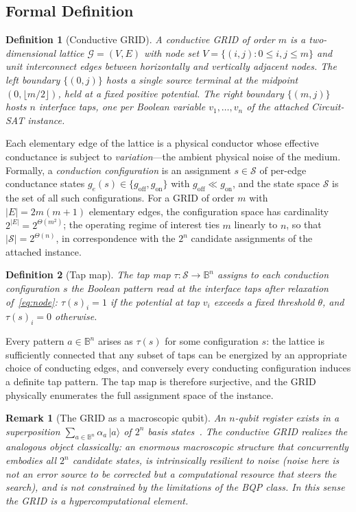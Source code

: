 \documentclass[letterpaper,journal]{IEEEtran}
\newtheorem{definition}{Definition}
\newtheorem{remark}{Remark}
\begin{document}
\subsection{Formal Definition}
\begin{definition}[Conductive GRID]
A \emph{conductive GRID} of order $m$ is a two-dimensional lattice
$\mathcal{G}=(V,E)$ with node set
$V=\{(i,j): 0\le i,j\le m\}$ and unit interconnect edges between
horizontally and vertically adjacent nodes. The left boundary
$\{(0,j)\}$ hosts a single \emph{source terminal} at the midpoint
$(0,\lfloor m/2\rfloor)$, held at a fixed positive potential. The right
boundary $\{(m,j)\}$ hosts $n$ \emph{interface taps}, one per Boolean
variable $v_1,\dots,v_n$ of the attached Circuit-SAT instance.
\end{definition}

Each elementary edge of the lattice is a physical conductor whose effective
conductance is subject to \emph{variation}---the ambient physical noise of
the medium. Formally, a \emph{conduction configuration} is an assignment
$s\in\mathcal{S}$ of per-edge conductance states
$g_e(s)\in\{g_{\mathrm{off}},g_{\mathrm{on}}\}$ with
$g_{\mathrm{off}}\ll g_{\mathrm{on}}$, and the state space $\mathcal{S}$ is
the set of all such configurations. For a GRID of order $m$ with
$\lvert E\rvert=2m(m+1)$ elementary edges, the configuration space has
cardinality $2^{\lvert E\rvert}=2^{\Theta(m^{2})}$; the operating regime of
interest ties $m$ linearly to $n$, so that
$\lvert\mathcal{S}\rvert=2^{\Theta(n)}$, in correspondence with the $2^{n}$
candidate assignments of the attached instance.

\begin{definition}[Tap map]
The \emph{tap map} $\tau:\mathcal{S}\to\mathbb{B}^{n}$ assigns to each
conduction configuration $s$ the Boolean pattern read at the interface taps
after relaxation of~\eqref{eq:node}: $\tau(s)_i = 1$ if the potential at
tap $v_i$ exceeds a fixed threshold $\theta$, and $\tau(s)_i=0$ otherwise.
\end{definition}

Every pattern $a\in\mathbb{B}^{n}$ arises as $\tau(s)$ for some
configuration $s$: the lattice is sufficiently connected that any subset of
taps can be energized by an appropriate choice of conducting edges, and
conversely every conducting configuration induces a definite tap pattern.
The tap map is therefore surjective, and the GRID physically enumerates the
full assignment space of the instance.

\begin{remark}[The GRID as a macroscopic qubit]
An $n$-qubit register exists in a superposition
$\sum_{a\in\mathbb{B}^n}\alpha_a\,\lvert a\rangle$ of $2^{n}$ basis
states~\cite{nielsen2000}. The conductive GRID realizes the analogous object
classically: an enormous macroscopic structure that concurrently embodies
all $2^{n}$ candidate states, is intrinsically resilient to noise (noise
here is not an error source to be corrected but a computational resource
that steers the search), and is not constrained by the limitations of the
BQP class. In this sense the GRID is a \emph{hypercomputational} element.
\end{remark}
\end{document}
